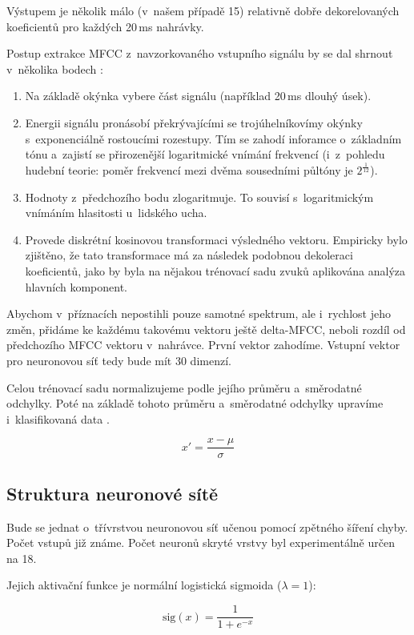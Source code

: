 \documentclass[10pt,a4paper]{article}
\begin{document}
Výstupem je několik málo (v~našem případě 15) relativně dobře dekorelovaných koeficientů
pro každých 20\,ms nahrávky.

Postup extrakce MFCC z~navzorkovaného vstupního signálu by se dal shrnout v~několika bodech \cite{mfccwiki}:

\begin{enumerate}
  \item Na základě okýnka vybere část signálu (například 20\,ms dlouhý úsek).
  \item Energii signálu pronásobí překrývajícími se trojúhelníkovímy okýnky s~exponenciálně rostoucími rozestupy.
        Tím se zahodí inforamce o~základním tónu a~zajistí se přirozenější logaritmické vnímání frekvencí
        (i~z~pohledu hudební teorie: poměr frekvencí mezi dvěma sousedními půltóny je $2^{\frac{1}{12}}$).
  \item Hodnoty z~předchozího bodu zlogaritmuje. To souvisí s~logaritmickým vnímáním hlasitosti u~lidského ucha.
  \item Provede diskrétní kosinovou transformaci výsledného vektoru. Empiricky bylo zjištěno, že tato transformace
        má za následek podobnou dekoleraci koeficientů, jako by byla na nějakou trénovací sadu zvuků aplikována
        analýza hlavních komponent.
\end{enumerate}

Abychom v~příznacích nepostihli pouze samotné spektrum, ale i~rychlost jeho změn,
přidáme ke každému takovému vektoru ještě delta-MFCC, neboli rozdíl
od předchozího MFCC vektoru v~nahrávce. První vektor zahodíme.
Vstupní vektor pro neuronovou síť tedy bude mít 30 dimenzí.

Celou trénovací sadu normalizujeme podle jejího průměru a~směrodatné odchylky.
Poté na základě tohoto průměru a~směrodatné odchylky upravíme i~klasifikovaná data \cite{nnfaq}.

$$ x' = \frac{x-\mu}{\sigma} $$

\subsection{Struktura neuronové sítě}

Bude se jednat o~třívrstvou neuronovou síť učenou pomocí zpětného šíření chyby.
Počet vstupů již známe.
Počet neuronů skryté vrstvy byl experimentálně určen na 18.

Jejich aktivační funkce je normální logistická sigmoida ($\lambda = 1$):

$$ \mbox{sig}(x) = \frac{1}{1+e^{-x}} $$
\end{document}
